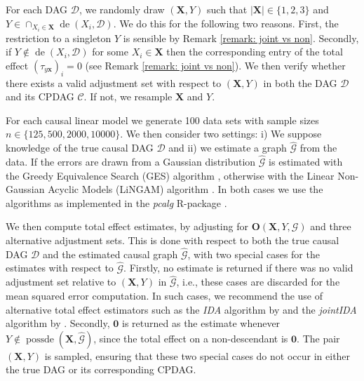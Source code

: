 \documentclass[11pt,a4paper]{article}
\theoremstyle{definition}
\theoremstyle{remark}
\DeclareMathOperator{\de}{de}
\DeclareMathOperator{\possde}{possde}
\newcommand{\g}[1][G]{\mathcal{#1}}
\begin{document}
For each DAG $\g[D]$, we randomly draw $(\mathbf{X},Y)$ such that $|\mathbf{X}| \in \{1,2,3\}$ and $Y \in \cap_{X_i\in \mathbf{X}} \de(X_i,\g[D])$. We do this for the following two reasons. First, the restriction to a singleton $Y$ is sensible by Remark \ref{remark: joint vs non}. Secondly, if $Y \notin \de(X_i,\g[D])$ for some $X_i\in \mathbf{X}$ then the corresponding entry of the total effect $(\tau_{y\mathbf{x}})_i =0$ (see Remark \ref{remark: joint vs non}). 
We then verify whether there exists a valid adjustment set with respect to $(\mathbf{X},Y)$ in both the DAG $\g[D]$ and its CPDAG $\g[C]$. If not, we resample $\mathbf{X}$ and $Y$. 

For each causal linear model we generate 100 data sets with sample sizes $n \in \{125,500,2000,10000\}$. We then consider two settings: i) We suppose knowledge of the true causal DAG $\g[D]$ and ii) we estimate a graph $\widehat{\g}$ from the data. If the errors are drawn from a Gaussian distribution $\widehat{\g}$  is estimated with the Greedy Equivalence Search (GES) algorithm \citep{Chickering02}, otherwise with the Linear Non-Gaussian Acyclic Models (LiNGAM) algorithm \citep{shimizu2006linear}. In both cases we use the algorithms as implemented in the {\em pcalg} R-package \citep{Kalisch2012}. 







We then compute total effect estimates, by adjusting for $\mathbf{O}(\mathbf{X},Y,\g)$ and three alternative adjustment sets. This is done with respect to both the true causal DAG $\g[D]$ and the estimated causal graph $\g[\widehat G]$, with two special cases for the estimates with respect to $\g[\widehat G]$. Firstly, no estimate is returned if there was no valid adjustment set relative to  $(\mathbf{X},Y)$ in $\widehat{\g}$, i.e., these cases are discarded for the mean squared error computation. In such cases, we recommend the use of alternative total effect estimators such as the {\em IDA} algorithm by \citet{maathuis2009estimating} and the {\em jointIDA} algorithm by \citet{nandy2017estimating}. 
Secondly, $\boldsymbol{0}$ is returned as the estimate whenever $Y \notin \possde(\mathbf{X},\widehat{\g})$, since the total effect on a non-descendant is $\boldsymbol{0}$. The pair $(\mathbf{X},Y)$ is sampled, ensuring that these two special cases do not occur in either the true DAG or its corresponding CPDAG. 
\end{document}
